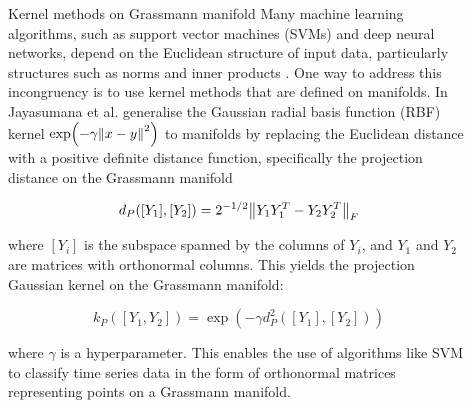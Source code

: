 \documentclass[final]{beamer}
\newlength{\sepwid}
\newlength{\onecolwid}
\newlength{\twocolwid}
\begin{document}
\begin{frame}[t]
\begin{columns}[t]
\begin{column}{\onecolwid}

\begin{block}{Kernel methods on Grassmann manifold}
    Many machine learning algorithms, such as support vector machines (SVMs) and deep neural
    networks, depend on the Euclidean structure of input data, particularly structures such as norms
    and inner products \cite{jayasumana_kernel_2015}. One way to address this incongruency is to use
    kernel methods that are defined on manifolds. In \cite{jayasumana_kernel_2015} Jayasumana et al.
    generalise the Gaussian radial basis function (RBF) kernel $\exp(-\gamma \norm{x - y}^2)$ to
    manifolds by replacing the Euclidean distance with a positive definite distance function,
    specifically the projection distance on the Grassmann manifold

    \begin{equation}
        d_P([Y_1], [Y_2]) = 2^{-1/2} \norm{Y_1Y_1^T - Y_2Y_2^T}_F
    \end{equation}

    where $[Y_i]$ is the subspace spanned by the columns of $Y_i$, and $Y_1$ and $Y_2$ are
    matrices with orthonormal columns. This yields the projection Gaussian kernel on the Grassmann
    manifold:

    \begin{equation}\label{eq:kernel}
        k_P([Y_1, Y_2]) = \exp(-\gamma d_P^2([Y_1], [Y_2]))
    \end{equation}

    where $\gamma$ is a hyperparameter. This enables the use of algorithms like SVM to classify time
    series data in the form of orthonormal matrices representing points on a Grassmann manifold.
\end{block}


\end{column} %

\begin{column}{\sepwid}\end{column} %

\begin{column}{\twocolwid} %


\end{column}
\end{columns}
\end{frame}
\end{document}
